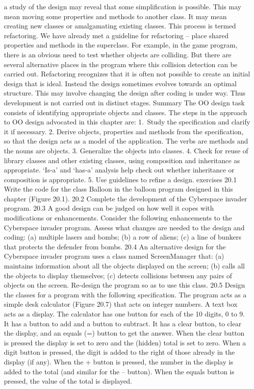 a study of the design may reveal that some simpliﬁcation is possible. This may mean moving some properties and methods to another class. It may mean creating new classes 
or amalgamating existing classes. This process is termed refactoring. We have already met a guideline for refactoring – place shared properties and methods in the superclass.
For example, in the game program, there is an obvious need to test whether objects are colliding. But there are several alternative places in the program where this collision detection can be carried out.
Refactoring recognizes that it is often not possible to create an initial design that is ideal. Instead the design sometimes evolves towards an optimal structure. This may involve changing the design after coding is under way. Thus development is not carried out in distinct stages.
Summary
The OO design task consists of identifying appropriate objects and classes. The steps in the approach to OO design advocated in this chapter are:
1. Study the speciﬁcation and clarify it if necessary.
2.	Derive objects, properties and methods from the speciﬁcation, so that the design acts as a model of the application. The verbs are methods and the nouns are objects.
3.	Generalize the objects into classes.
4.	Check for reuse of library classes and other existing classes, using composition and inheritance as appropriate. ‘Is-a’ and ‘has-a’ analysis help check out whether inheritance or composition is appropriate.
5.	Use guidelines to reﬁne a design.
exercises
20.1	Write the code for the class Balloon in the balloon program designed in this chapter (Figure 20.1).
20.2	Complete the development of the Cyberspace invader program.
20.3	A good design can be judged on how well it copes with modiﬁcations or enhancements. Consider the following enhancements to the Cyberspace 
invader program. Assess what changes are needed to the design and coding:
	(a)	multiple lasers and bombs;
	(b)	a row of aliens;
	(c)	a line of bunkers that protects the defender from bombs.
20.4	An alternative design for the Cyberspace invader program uses a class named ScreenManager that:
	(a)	maintains information about all the objects displayed on the screen;
	(b)	calls all the objects to display themselves;
	(c)	detects collisions between any pairs of objects on the screen.
	Re-design the program so as to use this class.
20.5	Design the classes for a program with the following speciﬁcation.
The program acts as a simple desk calculator (Figure 20.7) that acts on integer numbers. A text box acts as a display. The calculator has one button for each of 
the 10 digits, 0 to 9. It has a button to add and a button to subtract. It has a clear button, to clear the display, and an equals (=) button to get the answer.
When the clear button is pressed the display is set to zero and the (hidden) total is set to zero.
When a digit button is pressed, the digit is added to the right of those already in the display (if any).
When the + button is pressed, the number in the display is added to the total (and similar for the – button). 
When the equals button is pressed, the value of the total is displayed.

